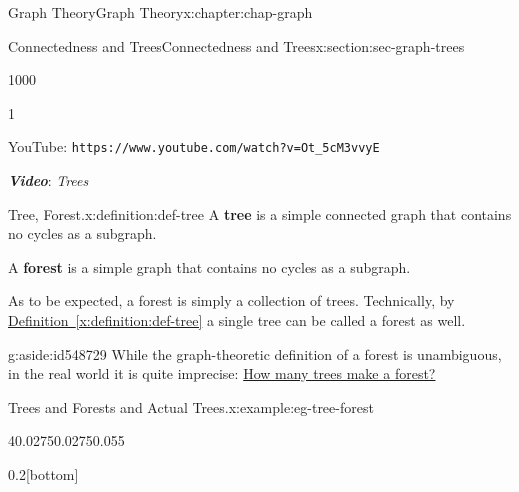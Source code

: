 \documentclass[oneside,10pt,]{book}
\newcommand{\xreffont}{\relax}
\newcommand{\mono}[1]{\texttt{#1}}
\newcommand{\alert}[1]{\textbf{\textit{#1}}}
\newcommand{\terminology}[1]{\textbf{#1}}
\numberwithin{equation}{section}
\newlength{\qrsize}
\begin{document}
\begin{chapterptx}{Graph Theory}{}{Graph Theory}{}{}{x:chapter:chap-graph}
\begin{sectionptx}{Connectedness and Trees}{}{Connectedness and Trees}{}{}{x:section:sec-graph-trees}
\begin{sidebyside}{1}{0}{0}{0}
\begin{sbspanel}{1}
\begin{tcbraster}[raster columns=2, raster column skip=1pt, raster halign=center, raster force size=false, raster left skip=0pt, raster right skip=0pt]
\begin{tcolorbox}[qrstyle]%
{\hypersetup{urlcolor=black}}%
\end{tcolorbox}%
\begin{tcolorbox}[captionstyle]%
\small YouTube: \mono{https://www.youtube.com/watch?v=Ot\_5cM3vvyE}\end{tcolorbox}%
\end{tcbraster}%
\end{sbspanel}%
\end{sidebyside}%
\par
\alert{Video}: \emph{Trees}%
\begin{definition}{Tree, Forest.}{x:definition:def-tree}%
A \terminology{tree} is a simple connected graph that contains no cycles as a subgraph.%
\par
A \terminology{forest} is a simple graph that contains no cycles as a subgraph.%
\end{definition}
As to be expected, a forest is simply a collection of trees. Technically, by \hyperref[x:definition:def-tree]{Definition~{\xreffont\ref{x:definition:def-tree}}} a single tree can be called a forest as well.%
\begin{aside}{}{g:aside:id548729}%
While the graph-theoretic definition of a forest is unambiguous, in the real world it is quite imprecise: \href{https://www.nature.org/en-us/what-we-do/our-insights/perspectives/how-many-trees-make-a-forest/}{How many trees make a forest?}%
\end{aside}
\begin{example}{Trees and Forests and Actual Trees.}{x:example:eg-tree-forest}%
\begin{sidebyside}{4}{0.0275}{0.0275}{0.055}%
\begin{sbspanel}{0.2}[bottom]%
\end{sbspanel}
\end{sidebyside}
\end{example}
\end{sectionptx}
\end{chapterptx}
\end{document}
